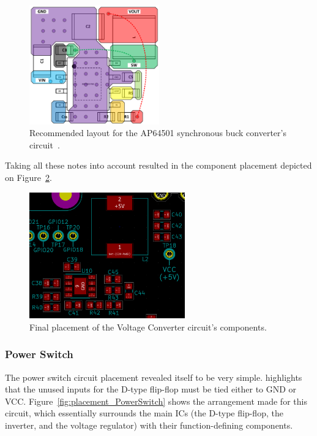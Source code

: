 \begin{figure}[h]
	\centering
	\includegraphics[width=0.5\textwidth]{Chapters/Figures/chapter5/AP64501_layout_Datasheet.pdf}
	\caption{Recommended layout for the AP64501 synchronous buck converter's circuit~\cite{AP64501}.}
	\label{fig:AP64501_layout_Datasheet}
\end{figure}

Taking all these notes into account resulted in the component placement depicted on Figure~\ref{fig:placement_VoltageConverter}.

\begin{figure}[h]
	\centering
	\includegraphics[width=0.6\textwidth]{Chapters/Figures/chapter5/placement_VoltageConverter.png}
	\caption{Final placement of the Voltage Converter circuit's components.}
	\label{fig:placement_VoltageConverter}
\end{figure}


\subsubsection{Power Switch}\label{sec:5115_PowerSwitch}

The power switch circuit placement revealed itself to be very simple.
\cite{SN74LVC2G74DCTR} highlights that the unused inputs for the D-type flip-flop must be tied either to GND or VCC. Figure~\ref{fig:placement_PowerSwitch} shows the arrangement made for this circuit, which essentially surrounds the main ICs (the D-type flip-flop, the inverter, and the voltage regulator) with their function-defining components.

